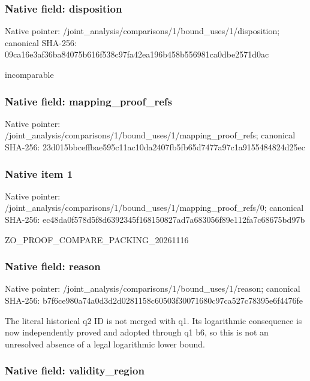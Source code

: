 \documentclass[10pt,a4paper]{article}
\begin{document}
\subsubsection{Native field: disposition}


Native pointer: /joint\_analysis/comparis\allowbreak{}ons/1/bound\_uses/1/dispo\allowbreak{}sition; canonical SHA-256: 09ca16e3af36ba84075b616f\allowbreak{}538c97fa42ea196b458b5569\allowbreak{}81ca0dbe2571d0ac


incomparable


\subsubsection{Native field: mapping\_proof\_refs}


Native pointer: /joint\_analysis/comparis\allowbreak{}ons/1/bound\_uses/1/mappi\allowbreak{}ng\_proof\_refs; canonical SHA-256: 23d015bbceffbae595c11ac1\allowbreak{}0da2407fb5fb65d7477a97c1\allowbreak{}a9155484824d25ec



\subsubsection{Native item 1}


Native pointer: /joint\_analysis/comparis\allowbreak{}ons/1/bound\_uses/1/mappi\allowbreak{}ng\_proof\_refs/0; canonical SHA-256: ec48da0f578d5f8d6392345f\allowbreak{}168150827ad7a683056f89e1\allowbreak{}12fa7c68675bd97b


ZO\_PROOF\_COMPARE\_PACKING\_20261116


\subsubsection{Native field: reason}


Native pointer: /joint\_analysis/comparis\allowbreak{}ons/1/bound\_uses/1/reaso\allowbreak{}n; canonical SHA-256: b7f6ce980a74a0d3d2d02811\allowbreak{}58c60503f30071680c97ca52\allowbreak{}7c78395e6f4476fe


The literal historical q2 ID is not merged with q1. Its logarithmic consequence is now independently proved and adopted through q1 b6, so this is not an unresolved absence of a legal logarithmic lower bound.


\subsubsection{Native field: validity\_region}
\end{document}
